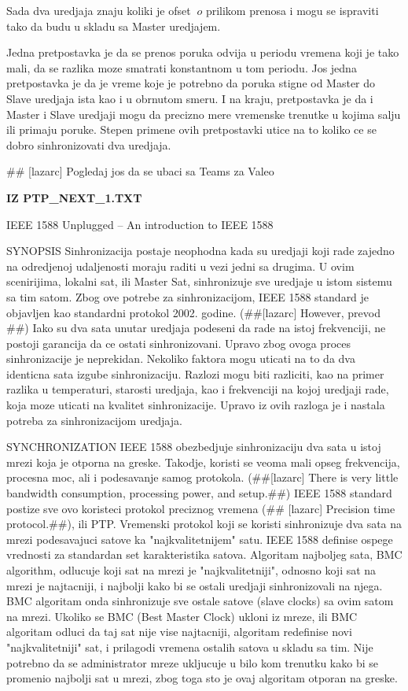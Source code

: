 \documentclass[a4paper,12pt, master]{etf}
\begin{document}
	Sada dva uredjaja znaju koliki je ofset $~o$ prilikom prenosa i mogu se ispraviti tako da 
	budu u skladu sa Master uredjajem.

	Jedna pretpostavka je da se prenos poruka odvija u periodu vremena koji je tako mali, da 
	se razlika moze smatrati konstantnom u tom periodu. Jos jedna pretpostavka je da je vreme 
	koje je potrebno da poruka stigne od Master do Slave uredjaja ista kao i u obrnutom 
	smeru. I na kraju, pretpostavka je da i Master i Slave uredjaji mogu da precizno mere 
	vremenske trenutke u kojima salju ili primaju poruke. Stepen primene ovih pretpostavki 
	utice na to koliko ce se dobro sinhronizovati dva uredjaja.

	\#\# [lazarc] Pogledaj jos da se ubaci sa Teams za Valeo

	\textbf{IZ PTP\_NEXT\_1.TXT}

	IEEE 1588 Unplugged – An introduction to IEEE 1588
	
	SYNOPSIS
	Sinhronizacija postaje neophodna kada su uredjaji koji rade zajedno na odredjenoj 
	udaljenosti moraju raditi u vezi jedni sa drugima. U ovim scenirijima, lokalni sat, ili 
	Master Sat, sinhronizuje sve uredjaje u istom sistemu sa tim satom. Zbog ove potrebe za 
	sinhronizacijom, IEEE 1588 standard je objavljen kao standardni protokol 2002. godine.
	(\#\#[lazarc] However, prevod \#\#) Iako su dva sata unutar uredjaja podeseni da rade na 
	istoj frekvenciji, ne postoji garancija da ce ostati sinhronizovani. Upravo zbog ovoga 
	proces sinhronizacije je neprekidan. Nekoliko faktora mogu uticati na to da dva identicna 
	sata izgube sinhronizaciju. Razlozi mogu biti razliciti, kao na primer razlika u 
	temperaturi, starosti uredjaja, kao i frekvenciji na kojoj uredjaji rade, koja moze 
	uticati na kvalitet sinhronizacije. Upravo iz ovih razloga je i nastala potreba za 
	sinhronizacijom uredjaja.
	
	SYNCHRONIZATION
	IEEE 1588 obezbedjuje sinhronizaciju dva sata u istoj mrezi koja je otporna na greske. 
	Takodje, koristi se veoma mali opseg frekvencija, procesna moc, ali i podesavanje samog 
	protokola. (\#\#[lazarc] There is very little bandwidth consumption, processing power, and 
	setup.\#\#) IEEE 1588 standard postize sve ovo koristeci protokol preciznog vremena (\#\#
	[lazarc] Precision time protocol.\#\#), ili PTP. Vremenski protokol koji se koristi 
	sinhronizuje dva sata na mrezi podesavajuci satove ka "najkvalitetnijem" satu. IEEE 1588 
	definise ospege vrednosti za standardan set karakteristika satova. Algoritam najboljeg 
	sata, BMC algorithm, odlucuje koji sat na mrezi je "najkvalitetniji", odnosno koji sat na 
	mrezi je najtacniji, i najbolji kako bi se ostali uredjaji sinhronizovali na njega. BMC 
	algoritam onda sinhronizuje sve ostale satove (slave clocks) sa ovim satom na mrezi. 
	Ukoliko se BMC (Best Master Clock) ukloni iz mreze, ili BMC algoritam odluci da taj sat 
	nije vise najtacniji, algoritam redefinise novi "najkvalitetniji" sat, i prilagodi 
	vremena ostalih satova u skladu sa tim. Nije potrebno da se administrator mreze ukljucuje 
	u bilo kom trenutku kako bi se promenio najbolji sat u mrezi, zbog toga sto je ovaj 
	algoritam otporan na greske.
	
\end{document}
